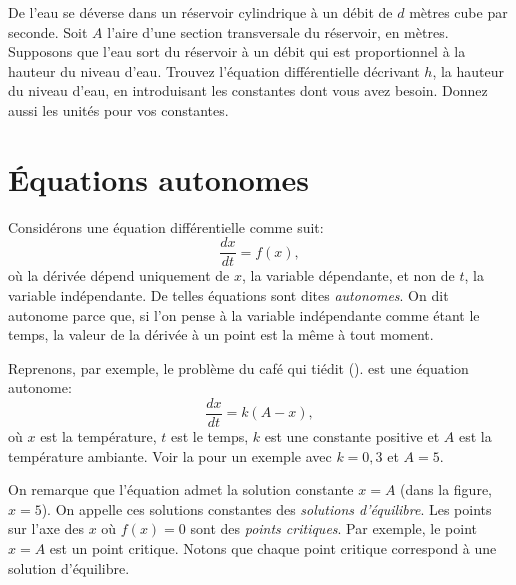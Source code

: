 \begin{exercise}
	De l'eau se déverse dans un réservoir cylindrique à un débit de $d$ mètres cube par seconde.
	Soit $A$ l'aire d'une section transversale du réservoir, en mètres.
	Supposons que l'eau sort du réservoir à un débit qui est proportionnel à la hauteur du niveau d'eau.
	Trouvez l'équation différentielle décrivant $h$, la hauteur du niveau d'eau, en introduisant les constantes dont vous avez besoin.
	Donnez aussi les unités pour vos constantes.
\end{exercise}



\sectionnewpage
\section{Équations autonomes}
\label{auteq:section}


Considérons une équation différentielle comme suit:
\begin{equation*}
	\frac{dx}{dt} = f(x),
\end{equation*}
où la dérivée dépend uniquement de $x$, la variable dépendante, et non de $t$, la variable indépendante.
De telles équations sont dites \emph{autonomes}.
On dit \og{}autonome\fg{} parce que, si l'on pense à la variable indépendante comme étant le temps, la valeur de la dérivée à un point est la même à tout moment.

Reprenons, par exemple, le problème du café qui tiédit ().
 est une équation autonome:
\begin{equation*}
	\frac{dx}{dt} = k (A-x),
\end{equation*}
où $x$ est la température, $t$ est le temps, $k$ est une constante positive
et $A$ est la température ambiante.
 Voir la  pour un exemple avec $k=0{,}3$ et $A=5$.

On remarque que l'équation admet la solution constante $x=A$ (dans la figure, $x=5$).
On appelle ces solutions constantes des \emph{solutions d'équilibre}.
Les points sur l'axe des $x$ où $f(x) = 0$ sont des \emph{points critiques}.
Par exemple, le point  $x=A$ est un point critique. Notons que chaque point critique correspond à une solution d'équilibre.

